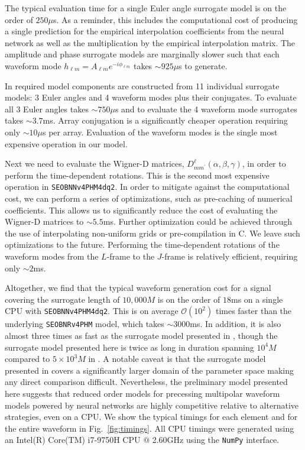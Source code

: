 \documentclass[prd,amssymb,amsmath,amsfonts,superscriptaddress,nofootinbib,reprint,showpacs, longbibliography]{revtex4-1}
\newcommand{\numpy}{\texttt{NumPy}{ }}
\newcommand{\SEOB}{\texttt{SEOBNRv4PHM}}
\newcommand{\SEOBNN}{\texttt{SEOBNN\textunderscore v4PHM\textunderscore4dq2}}
\begin{document}
The typical evaluation time for a single Euler angle surrogate model is on the order of $250 \mu$s. As a reminder, this includes the computational cost of producing a single prediction for the empirical interpolation coefficients from the neural network as well as the multiplication by the empirical interpolation matrix. The amplitude and phase surrogate models are marginally slower such that each waveform mode $h_{\ell m} = A_{\ell m} e^{-i \phi_{\ell m}}$ takes $\sim 925 \mu$s to generate. 

In required model components are constructed from 11 individual surrogate models: 3 Euler angles and 4 waveform modes plus their conjugates. To evaluate all 3 Euler angles takes $\sim 750 \mu$s and to evaluate the 4 waveform mode surrogates takes $\sim 3.7$ms. Array conjugation is a significantly cheaper operation requiring only $\sim 10 \mu$s per array. Evaluation of the waveform modes is the single most expensive operation in our model. 

Next we need to evaluate the Wigner-D matrices, $D^{\ell}_{m m^{\prime}} (\alpha,\beta,\gamma)$, in order to perform the time-dependent rotations. This is the second most expensive operation in \SEOBNN. In order to mitigate against the computational cost, we can perform a series of optimizations, such as pre-caching of numerical coefficients. This allows us to significantly reduce the cost of evaluating the Wigner-D matrices to $\sim 5.5$ms. Further optimization could be achieved through the use of interpolating non-uniform grids or pre-compilation in C. We leave such optimizations to the future. Performing the time-dependent rotations of the waveform modes from the $L$-frame to the $J$-frame is relatively efficient, requiring only $\sim 2$ms.

Altogether, we find that the typical waveform generation cost for a signal covering the surrogate length of $10,000M$ is on the order of $18$ms on a single CPU with \SEOBNN. This is on average $\mathcal{O}(10^2)$ times faster than the underlying \SEOB{} model, which takes $\sim 3000$ms. In addition, it is also almost three times as fast as the surrogate model presented in \cite{Gadre:2022sed}, though the surrogate model presented here is twice as long in duration spanning $10^4 M$ compared to $5 \times 10^3 M$ in \cite{Gadre:2022sed}. A notable caveat is that the surrogate model presented in \cite{Gadre:2022sed} covers a significantly larger domain of the parameter space making any direct comparison difficult. Nevertheless, the preliminary model presented here suggests that reduced order models for precessing multipolar waveform models powered by neural networks are highly competitive relative to alternative strategies, even on a CPU. We show the typical timings for each element and for the entire waveform in Fig.~\ref{fig:timings}. All CPU timings were generated using an Intel(R) Core(TM) i7-9750H CPU $@$ 2.60GHz using the \numpy interface. 
\end{document}
